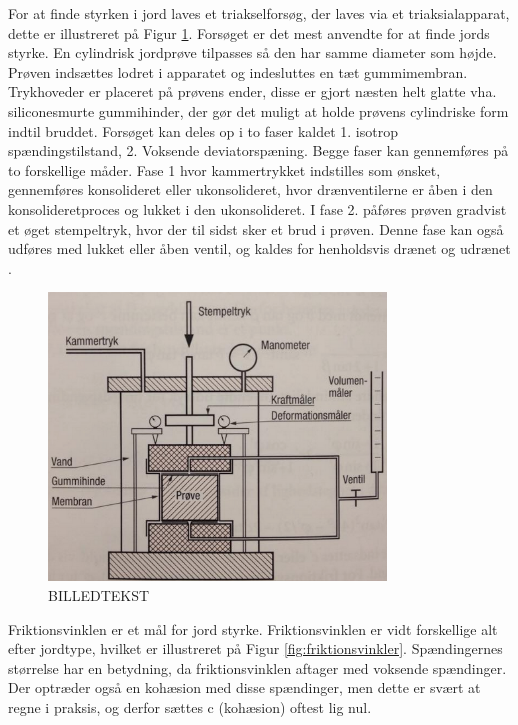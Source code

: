 For at finde styrken i jord laves et triakselforsøg, der laves via et triaksialapparat, dette er illustreret på Figur \ref{fig:forskudningsspanding}. Forsøget er det mest anvendte for at finde jords styrke. En cylindrisk jordprøve tilpasses så den har samme diameter som højde. Prøven indsættes lodret i apparatet og indesluttes en tæt gummimembran. Trykhoveder er placeret på prøvens ender, disse er gjort næsten helt glatte vha. siliconesmurte gummihinder, der gør det muligt at holde prøvens cylindriske form indtil bruddet.  
\newline \indent{     } Forsøget kan deles op i to faser kaldet 1. isotrop spændingstilstand, 2. Voksende deviatorspæning. Begge faser kan gennemføres på to forskellige måder. Fase 1 hvor kammertrykket indstilles som ønsket, gennemføres konsolideret eller ukonsolideret, hvor drænventilerne er åben i den konsolideretproces og lukket i den ukonsolideret. I fase 2. påføres prøven gradvist et øget stempeltryk, hvor der til sidst sker et brud i prøven. Denne fase kan også udføres med lukket eller åben ventil, og kaldes for henholdsvis drænet og udrænet \citep{geoteknik}.
\begin{figure}[htbp] \centering
	\begin{minipage}[b]{0.48\textwidth}\centering
		\includegraphics[width=0.8\textwidth]{billeder/forskud.png}
		\caption{BILLEDTEKST}
		\label{fig:forskudningsspanding}
	\end{minipage}\hfill
\end{figure}

\indent{     }  Friktionsvinklen er et mål for jord styrke. Friktionsvinklen er vidt forskellige alt efter jordtype, hvilket er illustreret på Figur \ref{fig:friktionsvinkler}. Spændingernes størrelse har en betydning, da friktionsvinklen aftager med voksende spændinger. Der optræder også en kohæsion med disse spændinger, men dette er svært at regne i praksis, og derfor sættes c (kohæsion) oftest lig nul. 


